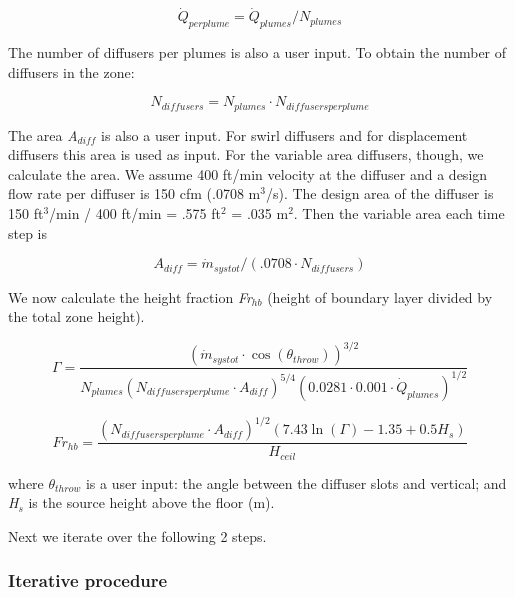 {\begin{equation}
{\dot Q_{perplume}} = {\dot Q_{plumes}}/{N_{plumes}}
\end{equation}

The number of diffusers per plumes is also a user input. To obtain the number of diffusers in the zone:

\begin{equation}
{N_{diffusers}} = {N_{plumes}}\cdot {N_{diffusersperplume}}
\end{equation}

The area \emph{A\(_{diff}\)} is also a user input. For swirl diffusers and for displacement diffusers this area is used as input. For the variable area diffusers, though, we calculate the area. We assume 400 ft/min velocity at the diffuser and a design flow rate per diffuser is 150 cfm (.0708 m\(^{3}\)/s). The design area of the diffuser is 150 ft\(^{3}\)/min / 400 ft/min = .575 ft\(^{2}\) = .035 m\(^{2}\). Then the variable area each time step is

\begin{equation}
{A_{diff}} = {\dot m_{systot}}/(.0708\cdot {N_{diffusers}})
\end{equation}

We now calculate the height fraction \emph{Fr\(_{hb}\)} (height of boundary layer divided by the total zone height).

\begin{equation}
\Gamma  = \frac{{{{({{\dot m}_{systot}}\cdot \cos ({\theta_{throw}}))}^{3/2}}}}{{{N_{plumes}}{{({N_{diffusersperplume}}\cdot {A_{diff}})}^{5/4}}{{(0.0281\cdot 0.001\cdot {{\dot Q}_{plumes}})}^{1/2}}}}
\end{equation}

\begin{equation}
F{r_{hb}} = \frac{{{{({N_{diffusersperplume}}\cdot {A_{diff}})}^{1/2}}(7.43\ln (\Gamma ) - 1.35 + 0.5{H_s})}}{{{H_{ceil}}}}
\end{equation}

where \emph{\(\theta_{throw}\)} is a user input: the angle between the diffuser slots and vertical; and \emph{H\(_{s}\)} is the source height above the floor (m).

Next we iterate over the following 2 steps.

\subsubsection{Iterative procedure}\label{iterative-procedure-1}

}
